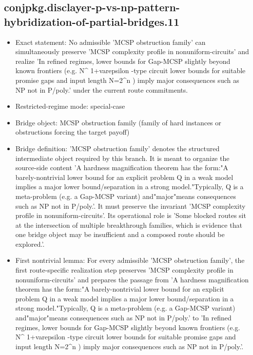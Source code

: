 \documentclass[11pt]{article}
\begin{document}
\subsection*{conjpkg.disclayer-p-vs-np-pattern-hybridization-of-partial-bridges.11}
\begin{itemize}
\item Exact statement: No admissible 'MCSP obstruction family' can simultaneously preserve 'MCSP complexity profile in nonuniform-circuits' and realize 'In refined regimes, lower bounds for Gap-MCSP slightly beyond known frontiers (e.g. N\textasciicircum{} 1+varepsilon -type circuit lower bounds for suitable promise gaps and input length N=2\textasciicircum{}n ) imply major consequences such as NP not in P/poly.' under the current route commitments.
\item Restricted-regime mode: special-case
\item Bridge object: MCSP obstruction family (family of hard instances or obstructions forcing the target payoff)
\item Bridge definition: 'MCSP obstruction family' denotes the structured intermediate object required by this branch. It is meant to organize the source-side content 'A hardness magnification theorem has the form:"A barely-nontrivial lower bound for an explicit problem Q in a weak model implies a major lower bound/separation in a strong model."Typically, Q is a meta-problem (e.g. a Gap-MCSP variant) and"major"means consequences such as NP not in P/poly.'. It must preserve the invariant 'MCSP complexity profile in nonuniform-circuits'. Its operational role is 'Some blocked routes sit at the intersection of multiple breakthrough families, which is evidence that one bridge object may be insufficient and a composed route should be explored.'.
\item First nontrivial lemma: For every admissible 'MCSP obstruction family', the first route-specific realization step preserves 'MCSP complexity profile in nonuniform-circuits' and prepares the passage from 'A hardness magnification theorem has the form:"A barely-nontrivial lower bound for an explicit problem Q in a weak model implies a major lower bound/separation in a strong model."Typically, Q is a meta-problem (e.g. a Gap-MCSP variant) and"major"means consequences such as NP not in P/poly.' to 'In refined regimes, lower bounds for Gap-MCSP slightly beyond known frontiers (e.g. N\textasciicircum{} 1+varepsilon -type circuit lower bounds for suitable promise gaps and input length N=2\textasciicircum{}n ) imply major consequences such as NP not in P/poly.'.

\end{itemize}
\end{document}

